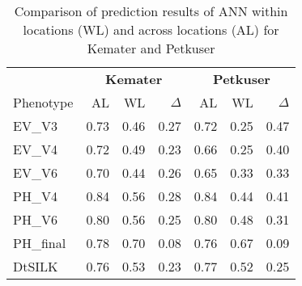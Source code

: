 \onehalfspacing
\begin{table}[H]
 \centering
 \caption[Comparison of prediction results of ANN within locations and across locations for Kemater and Petkuser]{Comparison of prediction results of ANN within locations (WL) and across locations (AL) for Kemater and Petkuser}
 \begin{tabular}{lrrr|rrr}
  \toprule
  & \multicolumn{3}{c}{\textbf{Kemater}} & \multicolumn{3}{c}{\textbf{Petkuser}}       \\
  Phenotype & AL                  & WL  & $\Delta$ & AL  & WL  & $\Delta$ \\ 
  \midrule
  EV\_V3  & 0.73                 & 0.46 & 0.27   & 0.72 & 0.25 & 0.47   \\ 
  EV\_V4  & 0.72                 & 0.49 & 0.23   & 0.66 & 0.25 & 0.40   \\ 
  EV\_V6  & 0.70                 & 0.44 & 0.26   & 0.65 & 0.33 & 0.33   \\ 
  PH\_V4  & 0.84                 & 0.56 & 0.28   & 0.84 & 0.44 & 0.41   \\ 
  PH\_V6  & 0.80                 & 0.56 & 0.25   & 0.80 & 0.48 & 0.31   \\ 
  PH\_final & 0.78                 & 0.70 & 0.08   & 0.76 & 0.67 & 0.09   \\ 
  DtSILK  & 0.76                 & 0.53 & 0.23   & 0.77 & 0.52 & 0.25   \\ 
 \bottomrule
 \end{tabular}
\end{table}
\doublespacing


